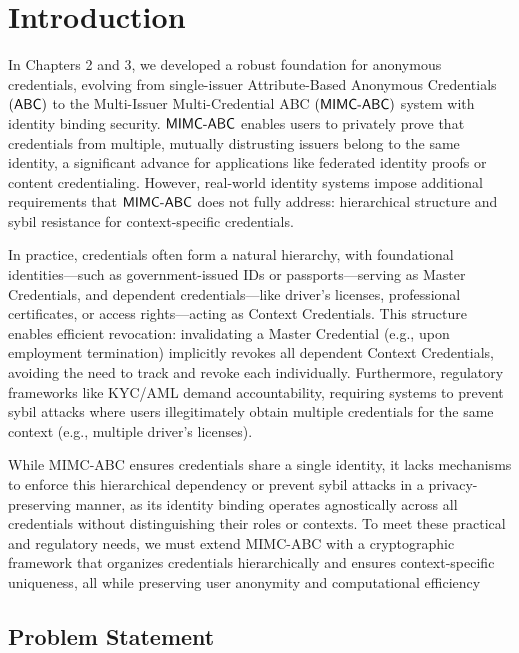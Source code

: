 
\section{Introduction}

In Chapters 2 and 3, we developed a robust foundation for anonymous credentials, evolving from single-issuer Attribute-Based Anonymous Credentials $(\mathsf{ABC})$ to the Multi-Issuer Multi-Credential ABC $(\mathsf{MIMC\text{-}ABC})$ system with identity binding security. $\mathsf{MIMC\text{-}ABC}$ enables users to privately prove that credentials from multiple, mutually distrusting issuers belong to the same identity, a significant advance for applications like federated identity proofs or content credentialing. However, real-world identity systems impose additional requirements that $\mathsf{MIMC\text{-}ABC}$ does not fully address: hierarchical structure and sybil resistance for context-specific credentials.

In practice, credentials often form a natural hierarchy, with foundational identities—such as government-issued IDs or passports—serving as Master Credentials, and dependent credentials—like driver’s licenses, professional certificates, or access rights—acting as Context Credentials. This structure enables efficient revocation: invalidating a Master Credential (e.g., upon employment termination) implicitly revokes all dependent Context Credentials, avoiding the need to track and revoke each individually. Furthermore, regulatory frameworks like KYC/AML demand accountability, requiring systems to prevent sybil attacks where users illegitimately obtain multiple credentials for the same context (e.g., multiple driver’s licenses). 

While MIMC-ABC ensures credentials share a single identity, it lacks mechanisms to enforce this hierarchical dependency or prevent sybil attacks in a privacy-preserving manner, as its identity binding operates agnostically across all credentials without distinguishing their roles or contexts. To meet these practical and regulatory needs, we must extend MIMC-ABC with a cryptographic framework that organizes credentials hierarchically and ensures context-specific uniqueness, all while preserving user anonymity and computational efficiency


\subsection{Problem Statement}

